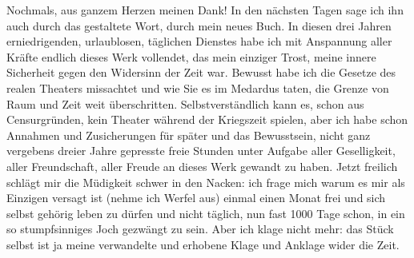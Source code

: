 \pstart
           Nochmals, aus ganzem Herzen meinen Dank! In den nächsten Tagen sage ich ihn auch
               durch das gestaltete Wort, durch mein neues Buch. In diesen drei Jahren erniedrigenden, urlaublosen,
               täglichen Dienstes habe ich mit Anspannung aller Kräfte endlich dieses {\pb}Werk vollendet, das mein einziger Trost, meine innere
               Sicherheit gegen den Widersinn der Zeit war. Bewusst habe ich die Gesetze des realen
               Theaters missachtet und wie Sie es im Medardus
               taten, die Grenze von Raum und Zeit weit überschritten. Selbstverständlich kann es,
               schon aus Censurgründen, kein Theater während der Kriegszeit spielen, aber ich habe
               schon Annahmen und Zusicherungen für später und das Bewusstsein, nicht ganz vergebens
               dreier Jahre gepresste freie Stunden unter Aufgabe aller Geselligkeit, aller
               Freundschaft, aller Freude an dieses Werk gewandt zu haben. Jetzt freilich schlägt
               mir die Müdigkeit schwer in den Nacken: ich frage mich warum es mir als Einzigen
               versagt ist (nehme ich Werfel aus) einmal
               einen Monat frei und sich selbst gehörig leben zu dürfen und nicht täglich, nun fast
               1000 Tage schon, in ein so stumpfsinniges Joch gezwängt zu sein. Aber ich klage nicht
               mehr: das Stück selbst ist ja
               meine verwandelte und erhobe{\pb}ne Klage und
               Anklage wider die Zeit.\pend
           
